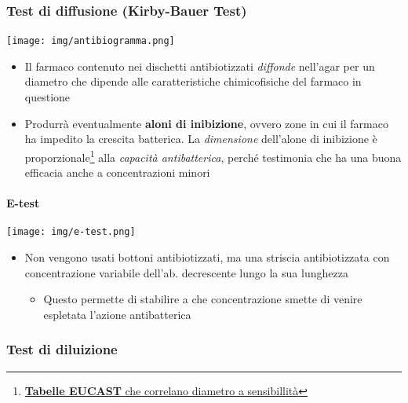 \documentclass[italian,]{article}
\providecommand{\tightlist}{%
  \setlength{\itemsep}{0pt}\setlength{\parskip}{0pt}}
\begin{document}
\hypertarget{test-di-diffusione-kirby-bauer-test}{%
\subsubsection{Test di diffusione (Kirby-Bauer
Test)}\label{test-di-diffusione-kirby-bauer-test}}

\texttt{[image: img/antibiogramma.png]}~

\begin{itemize}
\tightlist
\item
  Il farmaco contenuto nei dischetti antibiotizzati \emph{diffonde}
  nell'agar per un diametro che dipende alle caratteristiche
  chimicofisiche del farmaco in questione
\item
  Produrrà eventualmente \textbf{aloni di inibizione}, ovvero zone in
  cui il farmaco ha impedito la crescita batterica. La \emph{dimensione}
  dell'alone di inibizione è proporzionale\footnote{\href{http://www.eucast.org/fileadmin/src/media/PDFs/EUCAST_files/QC/v_10.0_EUCAST_QC_tables_routine_and_extended_QC.pdf}{\textbf{Tabelle
    EUCAST} che correlano diametro a sensibillità}} alla \emph{capacità
  antibatterica}, perché testimonia che ha una buona efficacia anche a
  concentrazioni minori
\end{itemize}

\hypertarget{e-test}{%
\paragraph{E-test}\label{e-test}}

\begin{center}
\texttt{[image: img/e-test.png]}
\end{center}

\begin{itemize}
\tightlist
\item
  Non vengono usati bottoni antibiotizzati, ma una striscia
  antibiotizzata con concentrazione variabile dell'ab. decrescente lungo
  la sua lunghezza

  \begin{itemize}
  \tightlist
  \item
    Questo permette di stabilire a che concentrazione smette di venire
    espletata l'azione antibatterica
  \end{itemize}
\end{itemize}

\hypertarget{test-di-diluizione}{%
\subsubsection{Test di diluizione}\label{test-di-diluizione}}
\end{document}
